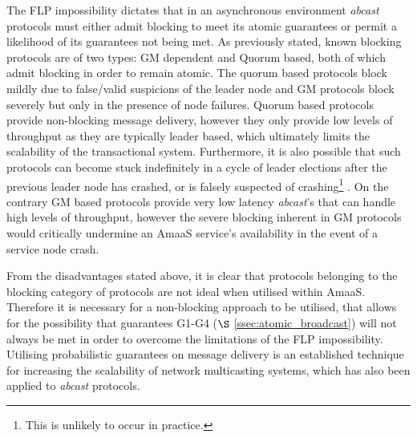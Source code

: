     The FLP impossibility \citep{Fischer:1985:IDC:3149.214121} dictates that in an asynchronous environment \emph{abcast} protocols must either admit blocking to meet its atomic guarantees or permit a likelihood of its guarantees not being met.  As  previously stated, known blocking protocols are of two types: GM dependent and Quorum based, both of which admit blocking in order to remain atomic.  The quorum based protocols block mildly due to false/valid suspicions of the leader node and GM protocols block severely but only in the presence of node failures.  Quorum based protocols provide non-blocking message delivery, however they only provide low levels of throughput as they are typically leader based, which ultimately limits the scalability of the transactional system.  Furthermore, it is also possible that such protocols can become stuck indefinitely in a cycle of leader elections after the previous leader node has crashed, or is falsely suspected of crashing\footnote{This is unlikely to occur in practice.} .    On the contrary GM based protocols provide very low latency \emph{abcast}'s that can handle high levels of throughput, however the severe blocking inherent in GM protocols would critically undermine an \textsf{AmaaS} service's availability in the event of a service node crash.  
    
    From the disadvantages stated above, it is clear that protocols belonging to the blocking category of protocols are not ideal when utilised within \textsf{AmaaS}.  Therefore it is necessary for a non-blocking approach to be utilised, that allows for the possibility that guarantees G1-G4 ($\S$ \ref{ssec:atomic_broadcast}) will not always be met in order to overcome the limitations of the FLP impossibility.  Utilising probabilistic guarantees on message delivery is an established technique for increasing the scalability of network multicasting systems\citep{Kermarrec:2003:PRD:766617.766623}, which has also been applied to \emph{abcast} protocols.  
    
